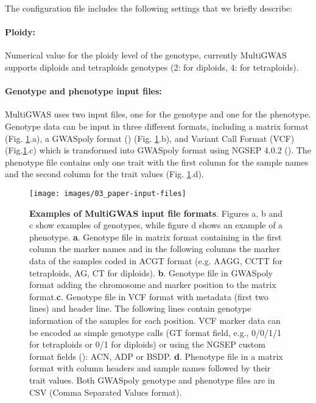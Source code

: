 \documentclass{article}
\begin{document}
The configuration file includes the following settings that we briefly describe:

\paragraph{{Ploidy:}} Numerical value for the ploidy level of the genotype, currently MultiGWAS supports diploids and tetraploids genotypes (2: for diploids, 4: for tetraploids).



\paragraph{Genotype and phenotype input files:}

MultiGWAS uses two input files, one for the genotype and one for the phenotype. Genotype data can be input in three different formats, including a matrix format (Fig. \ref{fig:File-Formats}.a), a GWASpoly format (\cite{Rosyara2016}) (Fig. \ref{fig:File-Formats}.b), and Variant Call Format (VCF) (Fig.\ref{fig:File-Formats}.c) which is transformed into GWASpoly format using NGSEP 4.0.2 (\cite{Duitama2019}). The phenotype file contains only one trait with the first column for the sample names and the second column for the trait values (Fig. \ref{fig:File-Formats}.d).

\begin{figure}[H]
\begin{centering}
\texttt{[image: images/03\_paper-input-files]} 
\par\end{centering}
\caption{\textbf{Examples of MultiGWAS input file formats}. Figures a, b and c show examples of genotypes, while figure d shows an example of a phenotype. \textbf{a}. Genotype file in matrix format containing in the first column the marker names and in the following columns the marker data of the samples coded in \textquotedbl{}ACGT\textquotedbl{} format (e.g. AAGG, CCTT for tetraploids, AG, CT for diploids). \textbf{b}. Genotype file in GWASpoly format adding the chromosome and marker position to the matrix format.\textbf{c}. Genotype file in VCF format with metadata (first two lines) and header line. The following lines contain genotype information of the samples for each position. VCF marker data can be encoded as simple genotype calls (GT format field, e.g., 0/0/1/1 for tetraploids or 0/1 for diploids) or using the NGSEP custom format fields (\cite{Duitama2019}): ACN, ADP or BSDP. \textbf{d}. Phenotype file in a matrix format with column headers and sample names followed by their trait values. Both GWASpoly genotype and phenotype files are in CSV (Comma Separated Values format).}
\label{fig:File-Formats}\protect 
\end{figure}
\end{document}
